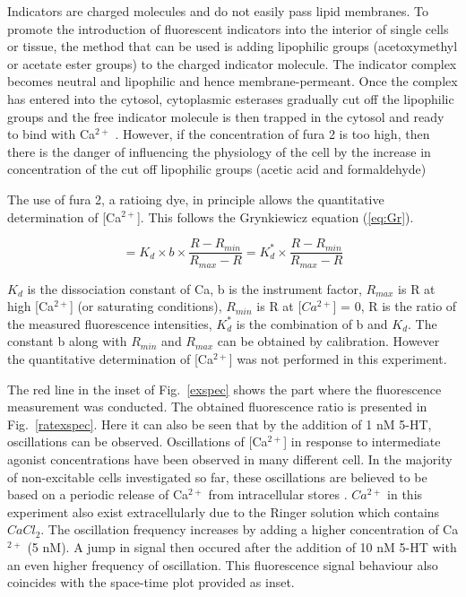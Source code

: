 Indicators are charged molecules and do not easily pass lipid membranes. 
To promote the introduction of fluorescent indicators into the interior of single cells or tissue, the method that can be used is adding lipophilic groups (acetoxymethyl or acetate ester groups) to the charged indicator molecule. 
The indicator complex becomes neutral and lipophilic and hence membrane-permeant. 
Once the complex has entered into the cytosol, cytoplasmic esterases gradually cut off the lipophilic groups and the free indicator molecule is then trapped in the cytosol and ready to bind with Ca$^{2+}$ \cite{Islam2012}. 
However, if the concentration of fura 2 is too high, then there is the danger of influencing the physiology of the cell by the increase in concentration of the cut off lipophilic groups (acetic acid and formaldehyde)

The use of fura 2, a ratioing dye, in principle allows the quantitative determination of [Ca$^{2+}$]. 
This follows the Grynkiewicz equation (\ref{eq:Gr}).

\begin{equation}
 [Ca^{2+}] = K_{d} \times b \times \frac{R-R_{min}}{R_{max}-R} = K_{d}^{*} \times \frac{R-R_{min}}{R_{max}-R}\label{eq:Gr}
\end{equation}

$K_{d}$ is the dissociation constant of Ca, b is the instrument factor, $R_{max}$ is R at high [Ca$^{2+}$] (or saturating conditions), $R_{min}$ is R at [$Ca^{2+}$] = 0, R is the ratio of the measured fluorescence intensities, $K_{d}^{*}$ is the combination of b and $K_{d}$. 
The constant b along with $R_{min}$ and $R_{max}$ can be obtained by calibration. 
However the quantitative determination of [Ca$^{2+}$] was not performed in this experiment.

The red line in the inset of Fig.~\ref{exspec} shows the part where the fluorescence measurement was conducted. 
The obtained fluorescence ratio is presented in Fig.~\ref{ratexspec}. 
Here it can also be seen that by the addition of 1 nM 5-HT, oscillations can be observed. Oscillations of [Ca$^{2+}$] in response to intermediate agonist concentrations have been observed in many different cell. In the majority of non-excitable cells investigated so far, these oscillations are believed to be based on a periodic release of Ca$^{2+}$ from intracellular stores \cite{Zimmermann1997}. 
$Ca^{2+}$ in this experiment also exist extracellularly due to the Ringer solution which contains $CaCl_2$. 
The oscillation frequency increases by adding a higher concentration of Ca$^{2+}$ (5 nM). 
A jump in signal then occured after the addition of 10 nM 5-HT with an even higher frequency of oscillation. This fluorescence signal behaviour also coincides with the space-time plot provided as inset.


